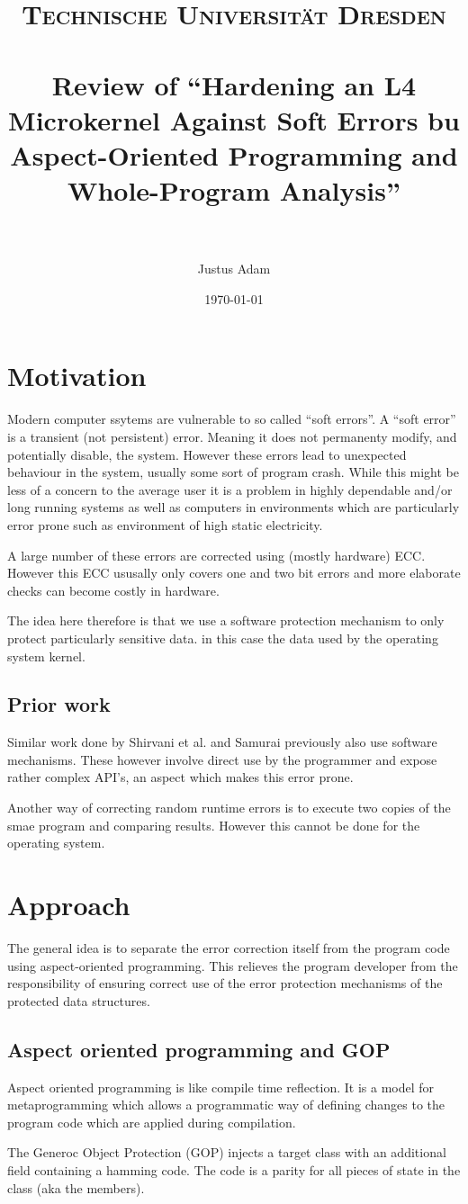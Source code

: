 \documentclass[paper=a4, fontsize=11pt]{scrartcl} %
\title{	
\normalfont \normalsize 
\textsc{Technische Universität Dresden} \\ [25pt] %
\horrule{0.5pt} \\[0.4cm] %
\huge Review of ``Hardening an L4 Microkernel Against Soft Errors bu Aspect-Oriented Programming and Whole-Program Analysis'' \\ %
\horrule{2pt} \\[0.5cm] %
}
\author{Justus Adam} %
\date{\normalsize\today} %
\numberwithin{equation}{section} %
\numberwithin{figure}{section} %
\numberwithin{table}{section} %
\begin{document}
\maketitle %

\section{Motivation}

Modern computer ssytems are vulnerable to so called ``soft errors''.
A ``soft error'' is a transient (not persistent) error.
Meaning it does not permanenty modify, and potentially disable, the system.
However these errors lead to unexpected behaviour in the system, usually some sort of program crash.
While this might be less of a concern to the average user it is a problem in highly dependable and/or long running systems as well as computers in environments which are particularly error prone such as environment of high static electricity.

A large number of these errors are corrected using (mostly hardware) ECC.
However this ECC ususally only covers one and two bit errors and more elaborate checks can become costly in hardware.

The idea here therefore is that we use a software protection mechanism to only protect particularly sensitive data.
in this case the data used by the operating system kernel.

\subsection{Prior work}

Similar work done by Shirvani et al. and Samurai previously also use software mechanisms.
These however involve direct use by the programmer and expose rather complex API's, an aspect which makes this error prone.

Another way of correcting random runtime errors is to execute two copies of the smae program and comparing results.
However this cannot be done for the operating system.

\section{Approach}

The general idea is to separate the error correction itself from the program code using aspect-oriented programming.
This relieves the program developer from the responsibility of ensuring correct use of the error protection mechanisms of the protected data structures.

\subsection{Aspect oriented programming and GOP}

Aspect oriented programming is like compile time reflection.
It is a model for metaprogramming which allows a programmatic way of defining changes to the program code which are applied during compilation.

The Generoc Object Protection (GOP) injects a target class with an additional field containing a hamming code.
The code is a parity for all pieces of state in the class (aka the members).
\end{document}
